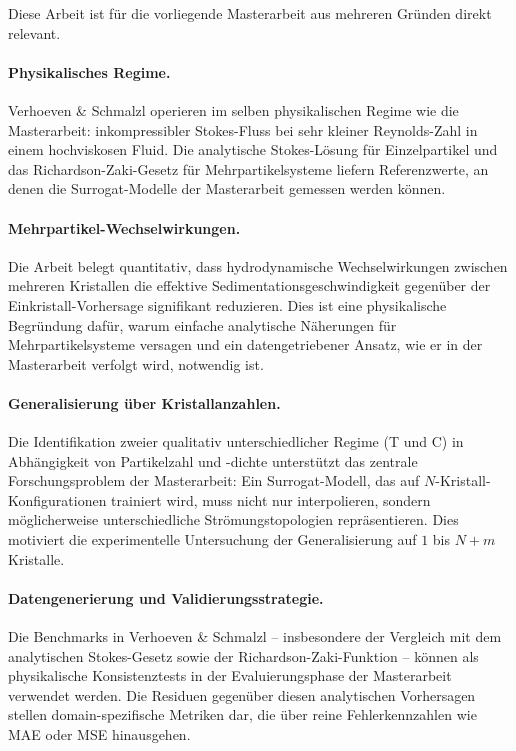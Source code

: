 \documentclass[a4paper,12pt]{article}
\begin{document}
Diese Arbeit ist f\"ur die vorliegende Masterarbeit aus mehreren Gr\"unden
direkt relevant.

\paragraph{Physikalisches Regime.}
Verhoeven \& Schmalzl operieren im selben physikalischen Regime wie die
Masterarbeit: inkompressibler Stokes-Fluss bei sehr kleiner Reynolds-Zahl in
einem hochviskosen Fluid. Die analytische Stokes-L\"osung f\"ur Einzelpartikel
und das Richardson-Zaki-Gesetz f\"ur Mehrpartikelsysteme liefern
Referenzwerte, an denen die Surrogat-Modelle der Masterarbeit gemessen werden
k\"onnen.

\paragraph{Mehrpartikel-Wechselwirkungen.}
Die Arbeit belegt quantitativ, dass hydrodynamische Wechselwirkungen zwischen
mehreren Kristallen die effektive Sedimentationsgeschwindigkeit gegen\"uber der
Einkristall-Vorhersage signifikant reduzieren. Dies ist eine physikalische
Begr\"undung daf\"ur, warum einfache analytische N\"aherungen f\"ur
Mehrpartikelsysteme versagen und ein datengetriebener Ansatz, wie er in der
Masterarbeit verfolgt wird, notwendig ist.

\paragraph{Generalisierung \"uber Kristallanzahlen.}
Die Identifikation zweier qualitativ unterschiedlicher Regime (T und C) in
Abh\"angigkeit von Partikelzahl und -dichte unterst\"utzt das zentrale
Forschungsproblem der Masterarbeit: Ein Surrogat-Modell, das auf $N$-Kristall-
Konfigurationen trainiert wird, muss nicht nur interpolieren, sondern
m\"oglicherweise unterschiedliche Str\"omungstopologien repr\"asentieren. Dies
motiviert die experimentelle Untersuchung der Generalisierung auf $1$ bis
$N{+}m$ Kristalle.

\paragraph{Datengenerierung und Validierungsstrategie.}
Die Benchmarks in Verhoeven \& Schmalzl -- insbesondere der Vergleich mit
dem analytischen Stokes-Gesetz sowie der Richardson-Zaki-Funktion -- k\"onnen
als physikalische Konsistenztests in der Evaluierungsphase der Masterarbeit
verwendet werden. Die Residuen gegen\"uber diesen analytischen Vorhersagen
stellen domain-spezifische Metriken dar, die \"uber reine Fehlerkennzahlen wie
MAE oder MSE hinausgehen.
\end{document}
